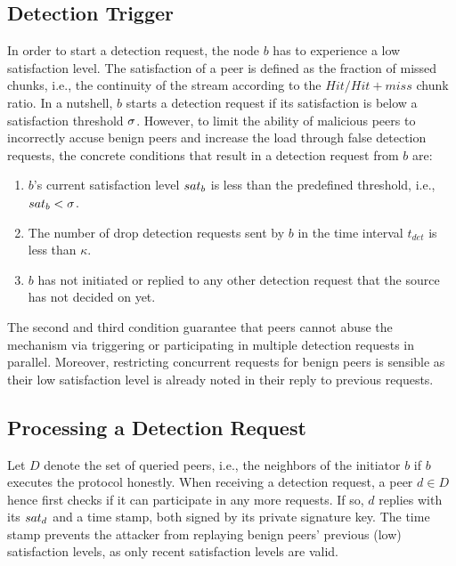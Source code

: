 \subsection{Detection Trigger}
\label{Detection-Trigger}


In order to start a detection request, the node $b$ has to experience a low satisfaction level. 
The satisfaction of a peer is defined as the fraction of missed chunks, i.e., the continuity of the stream according to the $Hit/Hit+miss$ chunk ratio.
In a nutshell, $b$ starts a detection request if its satisfaction is below a satisfaction threshold $\sigma$.
However, to limit the ability of malicious peers to incorrectly accuse benign peers and increase the load through false detection requests, the concrete conditions that result in a detection request from $b$ are: 


\begin{enumerate}
 \item $b$'s current satisfaction level $sat_b$ is less than the predefined threshold, i.e., $sat_b < \sigma$.
 \item The number of drop detection requests sent by $b$ in the time interval $t_{det}$ is less than $\kappa$. 
 \item $b$ has not initiated or replied to any other \drop detection request that the source has not decided on yet.
\end{enumerate}
The second and third condition guarantee that peers cannot abuse the mechanism via triggering or participating in multiple detection requests in parallel. 
Moreover, restricting concurrent requests for benign peers is sensible as their low satisfaction level is already noted in their reply to previous requests.

\subsection{Processing a Detection Request}
Let $D$ denote the set of queried peers, i.e., the neighbors of the initiator $b$ if $b$ executes the protocol honestly.  
When receiving a detection request, a peer $d \in D$ hence first checks if it can participate in any more requests.     
If so, $d$ replies with its $sat_d$ and a time stamp, both signed by its private signature key. 
The time stamp prevents the attacker from replaying benign peers' previous (low) satisfaction levels, as only recent satisfaction levels are valid.


